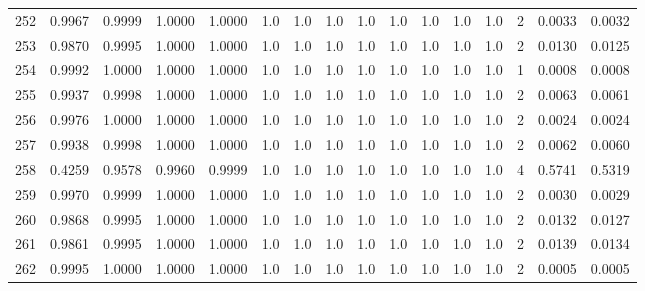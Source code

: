 \begin{tabular}{lrrrrrrrrrrrrrrr}
252 &      0.9967 &  0.9999 &  1.0000 &  1.0000 &     1.0 &     1.0 &     1.0 &     1.0 &     1.0 &     1.0 &      1.0 &        1.0 &      2 &                    0.0033 &                     0.0032 \\
253 &      0.9870 &  0.9995 &  1.0000 &  1.0000 &     1.0 &     1.0 &     1.0 &     1.0 &     1.0 &     1.0 &      1.0 &        1.0 &      2 &                    0.0130 &                     0.0125 \\
254 &      0.9992 &  1.0000 &  1.0000 &  1.0000 &     1.0 &     1.0 &     1.0 &     1.0 &     1.0 &     1.0 &      1.0 &        1.0 &      1 &                    0.0008 &                     0.0008 \\
255 &      0.9937 &  0.9998 &  1.0000 &  1.0000 &     1.0 &     1.0 &     1.0 &     1.0 &     1.0 &     1.0 &      1.0 &        1.0 &      2 &                    0.0063 &                     0.0061 \\
256 &      0.9976 &  1.0000 &  1.0000 &  1.0000 &     1.0 &     1.0 &     1.0 &     1.0 &     1.0 &     1.0 &      1.0 &        1.0 &      2 &                    0.0024 &                     0.0024 \\
257 &      0.9938 &  0.9998 &  1.0000 &  1.0000 &     1.0 &     1.0 &     1.0 &     1.0 &     1.0 &     1.0 &      1.0 &        1.0 &      2 &                    0.0062 &                     0.0060 \\
258 &      0.4259 &  0.9578 &  0.9960 &  0.9999 &     1.0 &     1.0 &     1.0 &     1.0 &     1.0 &     1.0 &      1.0 &        1.0 &      4 &                    0.5741 &                     0.5319 \\
259 &      0.9970 &  0.9999 &  1.0000 &  1.0000 &     1.0 &     1.0 &     1.0 &     1.0 &     1.0 &     1.0 &      1.0 &        1.0 &      2 &                    0.0030 &                     0.0029 \\
260 &      0.9868 &  0.9995 &  1.0000 &  1.0000 &     1.0 &     1.0 &     1.0 &     1.0 &     1.0 &     1.0 &      1.0 &        1.0 &      2 &                    0.0132 &                     0.0127 \\
261 &      0.9861 &  0.9995 &  1.0000 &  1.0000 &     1.0 &     1.0 &     1.0 &     1.0 &     1.0 &     1.0 &      1.0 &        1.0 &      2 &                    0.0139 &                     0.0134 \\
262 &      0.9995 &  1.0000 &  1.0000 &  1.0000 &     1.0 &     1.0 &     1.0 &     1.0 &     1.0 &     1.0 &      1.0 &        1.0 &      2 &                    0.0005 &                     0.0005 \\

\end{tabular}
